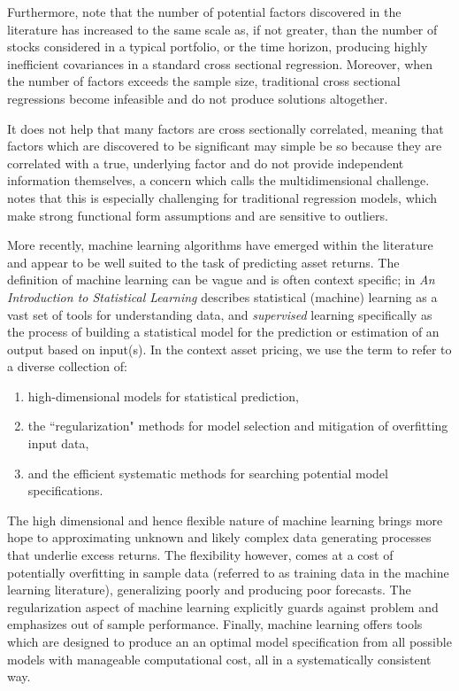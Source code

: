 \documentclass[a4paper, table]{article}
\begin{document}
Furthermore, \cite{feng_taming_2019} note that the number of potential factors discovered in the literature has increased to the same scale as, if not greater, than the number of stocks considered in a typical portfolio, or the time horizon, producing highly inefficient covariances in a standard cross sectional regression. Moreover, when the number of factors exceeds the sample size, traditional cross sectional regressions become infeasible and do not produce solutions altogether. 

It does not help that many factors are cross sectionally correlated, meaning that factors which are discovered to be significant may simple be so because they are correlated with a true, underlying factor and do not provide independent information themselves, a concern which \cite{cochrane_presidential_2011} calls the multidimensional challenge. \cite{freyberger_dissecting_2017} notes that this is especially challenging for traditional regression models, which make strong functional form assumptions and are sensitive to outliers. 

More recently, machine learning algorithms have emerged within the literature and appear to be well suited to the task of predicting asset returns. The definition of machine learning can be vague and is often context specific; \cite{hastie_elements_2009} in \textit{An Introduction to Statistical Learning} describes statistical (machine) learning as a vast set of tools for understanding data, and \textit{supervised} learning specifically as the process of building a statistical model for the prediction or estimation of an output based on input(s). In the context asset pricing, we use the term to refer to a diverse collection of:

\begin{enumerate}
	\item high-dimensional models for statistical prediction, 
	\item the ``regularization" methods for model selection and mitigation of overfitting input data, 
	\item and the efficient systematic methods for searching potential model specifications.
\end{enumerate}

The high dimensional and hence flexible nature of machine learning brings more hope to approximating unknown and likely complex data generating processes that underlie excess returns. The flexibility however, comes at a cost of potentially overfitting in sample data (referred to as training data in the machine learning literature), generalizing poorly and producing poor forecasts. The regularization aspect of machine learning explicitly guards against problem and emphasizes out of sample performance. Finally, machine learning offers tools which are designed to produce an an optimal model specification from all possible models with manageable computational cost, all in a systematically consistent way.
\end{document}
